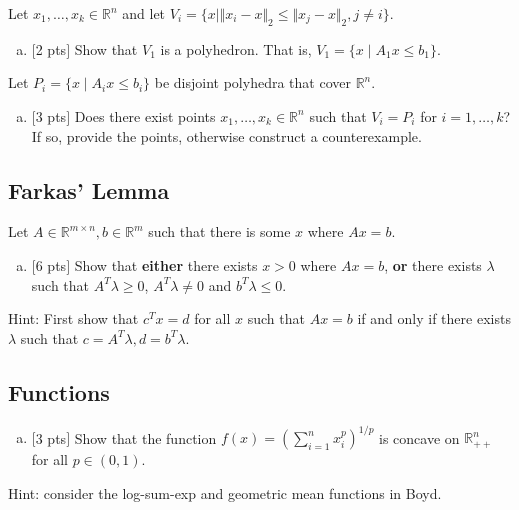 \documentclass[12pt]{article}
\begin{document}
\noindent Let $x_1,\ldots,x_k\in\mathbb{R}^n$ and let $V_i = \{x \mid \Vert x_i-x \Vert_2 \le \Vert x_j-x \Vert_2, j\ne i \}$.
\begin{enumerate}[(b)]
\item
$[$2 pts$]$  Show that $V_1$ is a polyhedron.  That is, $V_1 = \{x \mid A_1x \le b_1\}$.
\end{enumerate}

\vspace{.25cm}

\noindent Let $P_i = \{x \mid A_ix \le b_i\}$ be disjoint polyhedra that cover $\mathbb{R}^n$.
\begin{enumerate}[(c)]
\item
 $[$3 pts$]$  Does there exist points $x_1,\ldots,x_k\in\mathbb{R}^n$ such that $V_i = P_i$ for $i = 1,\ldots,k$?  If so, provide the points, otherwise construct a counterexample.
\end{enumerate}

\subsection{Farkas' Lemma}

Let $A\in\mathbb{R}^{m\times n}, b\in\mathbb{R}^m$ such that there is some $x$ where $Ax = b$.

\begin{enumerate}[(a)]
\item
$[$6 pts$]$  Show that {\bf either} there exists $x > 0$ where $Ax = b$, {\bf or} there exists $\lambda$ such that $A^T\lambda \ge 0$, $A^T\lambda \ne 0$ and $b^T\lambda \le 0$.
\end{enumerate}
Hint: First show that $c^Tx = d$ for all $x$ such that $Ax = b$ if and only if there exists $\lambda$ such that $c= A^T\lambda, d=b^T\lambda$.

\subsection{Functions}

\begin{enumerate}[(a)]
\item
$[$3 pts$]$  Show that the function $f(x) = \left( \sum_{i=1}^n x_i^p\right)^{1/p}$ is concave on $\mathbb{R}^n_{++}$ for all $p\in(0,1)$.
\end{enumerate}
Hint: consider the log-sum-exp and geometric mean functions in Boyd.

\vspace{.5cm}
\end{document}
